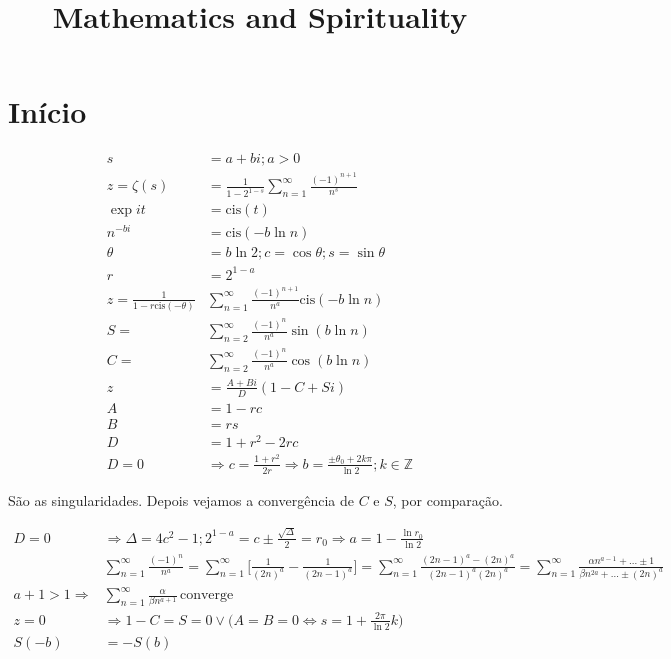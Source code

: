 \documentclass[12pt,a4paper]{article}
\title{Mathematics and Spirituality}
\date{}
\begin{document}
	\maketitle

	\tableofcontents
	\addtocontents{}{\protect\rule{\textwidth}{.2pt}\par}

	\section{In\'icio}

	\begin{align}
	s &= a + bi ; a > 0 \\
	z = \zeta(s) &= \frac{1}{1-2^{1-s}} \sum _{n = 1} ^{\infty} \frac{(-1)^{n+1}}{n^s} \\
	\exp{it} &= \mbox{cis}(t) \\
	n^{-bi} &= \mbox{cis}(-b \ln n) \\
	\theta &= b \ln 2; c = \cos \theta; s = \sin \theta \\
	r &= 2^{1-a} \\
	z = \frac{1}{1 - r \mbox{cis}(-\theta)} &\sum _{n = 1} ^{\infty} { \frac{(-1)^{n+1}}{n^a} \mbox{cis}(-b \ln n)} \\
	S = &\sum _{n = 2} ^{\infty} {\frac{(-1)^n}{n^a} \sin(b \ln n)} \\
	C = &\sum _{n = 2} ^{\infty} {\frac{(-1)^n}{n^a} \cos(b \ln n)} \\
	z &= \frac{A + Bi}{D} (1 - C + Si) \\
	A &= 1 - rc \\
	B &= rs \\
	D &= 1 + r^2 - 2rc \\
	D = 0 &\Rightarrow c = \frac{1 + r^2}{2r} \Rightarrow b = \frac{\pm \theta_0 + 2k\pi}{\ln 2}; k \in \mathbb{Z}
	\end{align}

	S\~ao as singularidades. Depois vejamos a converg\^encia de $C$ e $S$, por compara\c{c}\~ao.

	\begin{align}
	D = 0 &\Rightarrow \Delta = 4c^2 - 1; 2^{1-a} = c \pm \frac{\sqrt\Delta}{2} = r_0 \Rightarrow a = 1 - \frac{\ln r_0}{\ln 2} \\
	&\sum _{n = 1} ^{\infty} \frac{(-1)^n}{n^a} = \sum _{n = 1} ^{\infty} {\biggl[ \frac{1}{(2n)^a} - \frac{1}{(2n-1)^a} \biggr]} = \sum _{n = 1} ^{\infty} \frac{(2n-1)^a - (2n)^a}{(2n-1)^a(2n)^a} = \sum _{n = 1} ^{\infty} \frac{\alpha n^{a-1} + ... \pm 1}{\beta n^{2a} + ... \pm (2n)^a} \\
	a + 1 > 1 \Rightarrow &\sum _{n = 1} ^{\infty} \frac{\alpha}{\beta n^{a+1}} \, \mbox{converge} \\
	z = 0 &\Rightarrow 1 - C = S = 0 \vee \biggl( A = B = 0 \Leftrightarrow s = 1 + \frac{2\pi}{\ln 2}k \biggr) \\
	S(-b) &= -S(b)
	\end{align}
\end{document}
